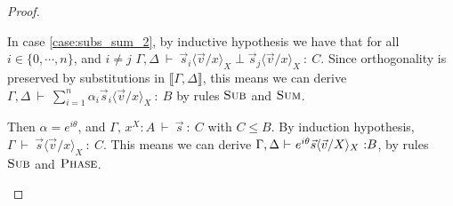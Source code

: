 \documentclass[a4paper,UKenglish,numberwithinsect,pdfa,anonymous]{lipics-v2021}
\theoremstyle{restatestyle}
\newcommand\ansubst[2]{\ensuremath{\langle #1 \rangle_{#2}}}
\def\sem#1{\llbracket#1\rrbracket}
\def\TYP#1#2#3{#1~{\vdash}~#2~{:}~#3}
\def\SORTH#1#2#3#4{#1~{\vdash}~#2\perp#3~{:}~#4}
\newcommand\B{\mathbb Z}
\begin{document}
\begin{proof}
\begin{description}
    In case \ref{case:subs_sum_2}, by inductive hypothesis we have that for all $i\in\{0,\dotsb,n\}$, and $i\neq j$ $\SORTH{\Gamma,\Delta}{\vec{s}_{i}\ansubst{\vec{v}/x}{X}}{\vec{s}_{j}\ansubst{\vec{v}/x}{X}}{C}$. Since orthogonality is preserved by substitutions in $\sem{\Gamma,\Delta}$, this means we can derive $\TYP{\Gamma,\Delta}{\sum_{i=1}^n\alpha_i \vec{s}_{i}\ansubst{\vec{v}/x}{X}}{B}$ by rules $\textsc{Sub}$ and $\textsc{Sum}$.

    \item[$\vec{t}=\alpha\vec{s}$:] Then $\alpha=e^{i\theta}$, and $\TYP{\Gamma,\,x^{X}\!:\!A}{\vec{s}}{C}$ with $C\leq B$. By induction hypothesis, $\TYP{\Gamma}{\vec{s}\ansubst{\vec{v}/x}{X}}{C}$. This means we can derive $\TYP{\Gamma,\Delta}{e^{i\theta}\vec{s}\ansubst{\vec{v}/X}{X}}{\\B}$, by rules $\textsc{Sub}$ and $\textsc{Phase}$.
      \qedhere
  \end{description}
\end{proof}
\end{document}
